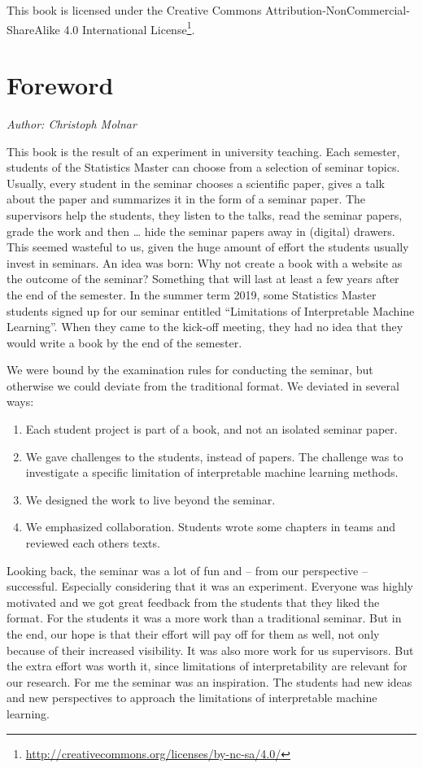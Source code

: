 \documentclass[]{krantz}
\providecommand{\tightlist}{%
  \setlength{\itemsep}{0pt}\setlength{\parskip}{0pt}}
\renewcommand{\href}[2]{#2\footnote{\url{#1}}}
\begin{document}
This book is licensed under the
\href{http://creativecommons.org/licenses/by-nc-sa/4.0/}{Creative
Commons Attribution-NonCommercial-ShareAlike 4.0 International License}.

\mainmatter

\chapter{Foreword}\label{foreword}

\emph{Author: Christoph Molnar}

This book is the result of an experiment in university teaching. Each
semester, students of the Statistics Master can choose from a selection
of seminar topics. Usually, every student in the seminar chooses a
scientific paper, gives a talk about the paper and summarizes it in the
form of a seminar paper. The supervisors help the students, they listen
to the talks, read the seminar papers, grade the work and then \ldots{}
hide the seminar papers away in (digital) drawers. This seemed wasteful
to us, given the huge amount of effort the students usually invest in
seminars. An idea was born: Why not create a book with a website as the
outcome of the seminar? Something that will last at least a few years
after the end of the semester. In the summer term 2019, some Statistics
Master students signed up for our seminar entitled ``Limitations of
Interpretable Machine Learning''. When they came to the kick-off
meeting, they had no idea that they would write a book by the end of the
semester.

We were bound by the examination rules for conducting the seminar, but
otherwise we could deviate from the traditional format. We deviated in
several ways:

\begin{enumerate}
\def\labelenumi{\arabic{enumi}.}
\tightlist
\item
  Each student project is part of a book, and not an isolated seminar
  paper.
\item
  We gave challenges to the students, instead of papers. The challenge
  was to investigate a specific limitation of interpretable machine
  learning methods.
\item
  We designed the work to live beyond the seminar.
\item
  We emphasized collaboration. Students wrote some chapters in teams and
  reviewed each others texts.
\end{enumerate}

Looking back, the seminar was a lot of fun and -- from our perspective
-- successful. Especially considering that it was an experiment.
Everyone was highly motivated and we got great feedback from the
students that they liked the format. For the students it was a more work
than a traditional seminar. But in the end, our hope is that their
effort will pay off for them as well, not only because of their
increased visibility. It was also more work for us supervisors. But the
extra effort was worth it, since limitations of interpretability are
relevant for our research. For me the seminar was an inspiration. The
students had new ideas and new perspectives to approach the limitations
of interpretable machine learning.
\end{document}
